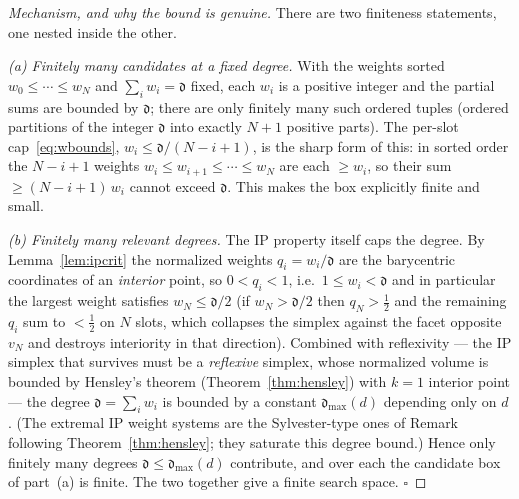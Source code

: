 \documentclass{amsart}
\begin{document}
\begin{proof}[Mechanism, and why the bound is genuine]
There are two finiteness statements, one nested inside the other.

\emph{(a) Finitely many candidates at a fixed degree.} With the weights sorted
$w_0\le\cdots\le w_N$ and $\sum_i w_i=\mathfrak d$ fixed, each $w_i$ is a
positive integer and the partial sums are bounded by $\mathfrak d$; there are
only finitely many such ordered tuples (ordered partitions of the integer
$\mathfrak d$ into exactly $N{+}1$ positive parts). The per-slot
cap~\eqref{eq:wbounds}, $w_i\le \mathfrak d/(N-i+1)$, is the sharp form of
this: in sorted order the $N-i+1$ weights $w_i\le w_{i+1}\le\cdots\le w_N$ are
each $\ge w_i$, so their sum $\ge (N-i+1)\,w_i$ cannot exceed $\mathfrak d$.
This makes the box explicitly finite and small.

\emph{(b) Finitely many relevant degrees.} The IP property itself caps the
degree. By Lemma~\ref{lem:ipcrit} the normalized weights $q_i=w_i/\mathfrak d$
are the barycentric coordinates of an \emph{interior} point, so
$0<q_i<1$, i.e.\ $1\le w_i<\mathfrak d$ and in particular the largest weight
satisfies $w_N\le \mathfrak d/2$ (if $w_N>\mathfrak d/2$ then
$q_N>\tfrac12$ and the remaining $q_i$ sum to $<\tfrac12$ on $N$ slots, which
collapses the simplex against the facet opposite $v_N$ and destroys
interiority in that direction). Combined with reflexivity --- the IP simplex
that survives must be a \emph{reflexive} simplex, whose normalized volume is
bounded by Hensley's theorem (Theorem~\ref{thm:hensley}) with $k=1$ interior
point --- the degree $\mathfrak d=\sum_i w_i$ is bounded by a constant
$\mathfrak d_{\max}(d)$ depending only on $d$. (The extremal IP weight systems
are the Sylvester-type ones of Remark following Theorem~\ref{thm:hensley};
they saturate this degree bound.) Hence only finitely many degrees
$\mathfrak d\le \mathfrak d_{\max}(d)$ contribute, and over each the candidate
box of part~(a) is finite. The two together give a finite search space.
$\square$
\end{proof}
\end{document}
